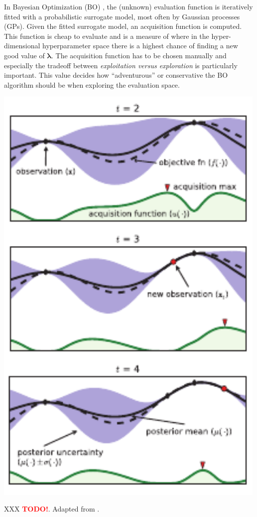 \documentclass[a4paper, twoside, nobib]{tufte-book}
\newcommand{\q}[1]{``#1''}
\newcommand{\autocite}[1]{\citep{#1}}
\newcommand{\TODO}{\textcolor{red}{\bf TODO!}\xspace}
\begin{document}
In Bayesian Optimization (BO) \autocite{brochuTutorialBayesianOptimization2010}, the (unknown) evaluation function is iteratively fitted with a probabilistic surrogate model, most often by Gaussian processes (GPs). Given the fitted surrogate model, an acquisition function is computed. This function is cheap to evaluate and is a measure of where in the hyper-dimensional hyperparameter space there is a highest chance of finding a new good value of $\bm{\lambda}$. The acquisition function has to be chosen manually and especially the tradeoff between \emph{exploitation versus exploration} is particularly important. This value decides how \q{adventurous} or conservative the BO algorithm should be when exploring the evaluation space. 

\begin{marginfigure}
  \includegraphics[width=0.99\textwidth]{figures/bayesian_optimization/bo.pdf}
  \caption[Bayesian Optimization]{XXX \TODO. Adapted from \citet{brochuTutorialBayesianOptimization2010}.}
  \label{fig:ml:bayesian_optimization}
\end{marginfigure}
\end{document}
